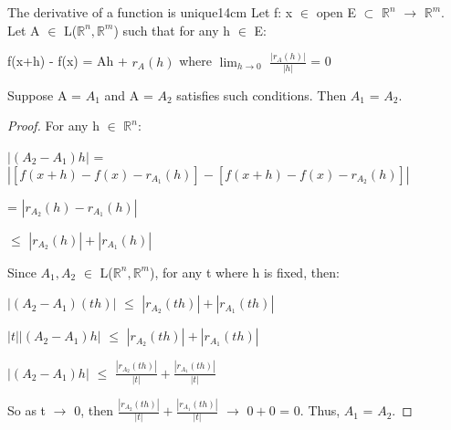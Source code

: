     \vspace{0.5cm}



    \begin{wtheorem}{The derivative of a function is unique}{14cm}
        Let f: x $\in$ open E $\subset$ $\mathbb{R}^n$ $\rightarrow$ $\mathbb{R}^m$.
        Let A $\in$ L($\mathbb{R}^n,\mathbb{R}^m$) such that
        for any h $\in$ E:

        \hspace{0.5cm}
        f(x+h) - f(x) = Ah + $r_A(h)$
        \hspace{1cm}
        where $\lim_{h \rightarrow 0}$ $\frac{|r_A(h)|}{|h|}$ = 0

        Suppose A = $A_1$ and A = $A_2$ satisfies such conditions.
        Then $A_1$ = $A_2$.
    \end{wtheorem}

    \begin{proof}
        For any h $\in$ $\mathbb{R}^n$:
        
        \hspace{0.5cm}
        $|(A_2-A_1)h|$
        = $|[f(x+h)-f(x)-r_{A_1}(h)] - [f(x+h)-f(x)-r_{A_2}(h)]|$

        \hspace{2.9cm}
        = $|r_{A_2}(h) - r_{A_1}(h)|$

        \hspace{2.9cm}
        $\leq$ $|r_{A_2}(h)| + |r_{A_1}(h)|$

        Since $A_1,A_2$ $\in$ L($\mathbb{R}^n,\mathbb{R}^m$),
        for any t where h is fixed, then:

        \hspace{0.5cm}
        $|(A_2-A_1)(th)|$ $\leq$ $|r_{A_2}(th)| + |r_{A_1}(th)|$

        \hspace{0.5cm}
        $|t| |(A_2-A_1)h|$ $\leq$ $|r_{A_2}(th)| + |r_{A_1}(th)|$

        \hspace{0.5cm}
        $|(A_2-A_1)h|$ $\leq$ $\frac{|r_{A_2}(th)|}{|t|}
                                + \frac{|r_{A_1}(th)|}{|t|}$

        So as t $\rightarrow$ 0, then
        $\frac{|r_{A_2}(th)|}{|t|} + \frac{|r_{A_1}(th)|}{|t|}$ $\rightarrow$
        $0+0$ = 0. Thus, $A_1$ = $A_2$.
    \end{proof}

    \newpage



